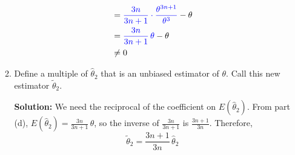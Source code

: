 \documentclass[12pt]{article}
\begin{document}
\begin{enumerate}
\begin{enumerate}
\begin{mybox}
\begin{align}
            &= \color{blue}\frac{3n}{3n+1}\cdot\frac{\theta^{3n+1}}{\theta^3}\color{black} - \theta \notag\\
            &= \color{blue}\frac{3n}{3n+1}\,\theta \color{black} - \theta \notag\\
            &\neq 0 \notag
            \end{align}
            \begin{center}\color{magenta}\color{black}\end{center}
        \end{mybox}
        
        \newpage
        \item
        Define a multiple of $\hat{\theta}_2$ that is an unbiased estimator of $\theta$. Call this new estimator $\tilde{\theta}_2$.
        \begin{mybox}
                \textbf{Solution:} We need the reciprocal of the coefficient on $E(\hat{\theta}_2)$. From part (d),  $E(\hat{\theta}_2) = \frac{3n}{3n+1}\,\theta$, so the inverse of $\frac{3n}{3n+1}$ is $\frac{3n+1}{3n}$. Therefore,
                $$\tilde{\theta}_2 = \frac{3n+1}{3n}\,\hat{\theta}_2$$
                \begin{center}\color{magenta}\color{black}\end{center}
        \end{mybox}
        

\end{enumerate}
\end{enumerate}
\end{document}
